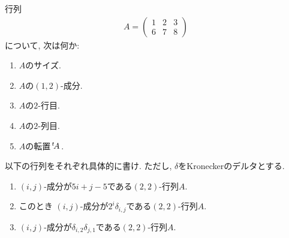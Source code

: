 
\begin{quiz}
  行列 
  \begin{align*}
    A=
    \begin{pmatrix}
      1&2&3\\6&7&8
    \end{pmatrix}
  \end{align*}
  について, 次は何か:
  \begin{enumerate}
  \item $A$のサイズ.
  \item $A$の$(1,2)$-成分.
  \item $A$の$2$-行目.
  \item $A$の$2$-列目.
  \item $A$の転置${\left.^{t}\!A\right.}$.
  \end{enumerate}
\end{quiz}

\begin{quiz} 
  以下の行列をそれぞれ具体的に書け.
  ただし, $\delta$をKroneckerのデルタとする. 
  \begin{enumerate}
  \item $(i,j)$-成分が$5i+j-5$である$(2,2)$-行列$A$.
  \item このとき
    $(i,j)$-成分が$2^i\delta_{i,j}$である$(2,2)$-行列$A$.
  \item
    $(i,j)$-成分が$\delta_{i,2}\delta_{j,1}$である$(2,2)$-行列$A$.
  \end{enumerate}
\end{quiz}

